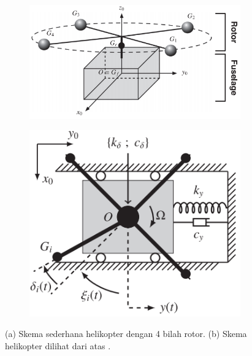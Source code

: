 \begin{figure}[H]
	\centering 
	\begin{subfigure}{0.5\textwidth}
		\centering
		\includegraphics[width=\linewidth]{gambar/rotor_fuselage.png}
		\caption{}
		\label{fig:rotorfuselage}
	\end{subfigure}
	\centering
	\begin{subfigure}{0.35\textwidth}
		\centering
		\includegraphics[width=\linewidth]{gambar/rotor_fuselage_topview.png}
		\caption{}
		\label{fig:topviewrotorfuslage}
	\end{subfigure}
	\caption{(a) Skema sederhana helikopter dengan 4 bilah rotor. (b) Skema helikopter dilihat dari atas \cite{BERGEOT201672}.}
	\label{fig:simplifiedmodel}
\end{figure}

